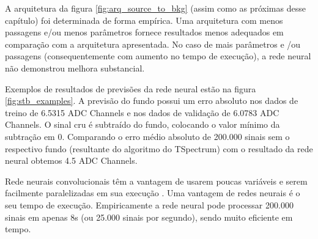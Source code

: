 \documentclass[a4paper,12pt,oneside]{book}
\begin{document}

\par A arquitetura da figura \ref{fig:arq_source_to_bkg} (assim como as próximas desse capítulo) foi determinada de forma empírica. Uma arquitetura com menos passagens e/ou menos parâmetros fornece resultados menos adequados em comparação com a arquitetura apresentada. No caso de mais parâmetros e /ou passagens (consequentemente com aumento no tempo de execução), a rede neural não demonstrou melhora substancial.

\par Exemplos de resultados de previsões da rede neural estão na figura \ref{fig:stb_examples}. A previsão do fundo possui um erro absoluto nos dados de treino de 6.5315 ADC Channels e nos dados de validação de 6.0783 ADC Channels. O sinal cru é subtraído do fundo, colocando o valor mínimo da subtração em 0. Comparando o erro médio absoluto de 200.000 sinais sem o respectivo fundo (resultante do algoritmo do TSpectrum) com o resultado da rede neural obtemos 4.5 ADC Channels.

\par Rede neurais convolucionais têm a vantagem de usarem poucas variáveis e serem facilmente paralelizadas em sua execução \cite{mlbook}. Uma vantagem de redes neurais é o seu tempo de execução. Empiricamente a rede neural pode processar 200.000 sinais em apenas 8s (ou 25.000 sinais por segundo), sendo muito eficiente em tempo.
\end{document}
